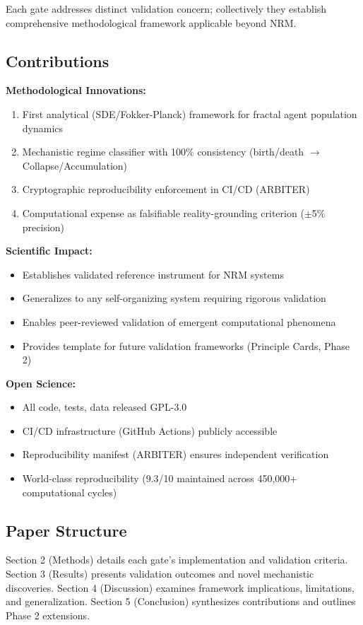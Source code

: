 \documentclass[11pt]{article}
\begin{document}
Each gate addresses distinct validation concern; collectively they establish comprehensive methodological framework applicable beyond NRM.

\subsection{Contributions}

\textbf{Methodological Innovations:}
\begin{enumerate}
\item First analytical (SDE/Fokker-Planck) framework for fractal agent population dynamics
\item Mechanistic regime classifier with 100\% consistency (birth/death $\to$ Collapse/Accumulation)
\item Cryptographic reproducibility enforcement in CI/CD (ARBITER)
\item Computational expense as falsifiable reality-grounding criterion ($\pm$5\% precision)
\end{enumerate}

\textbf{Scientific Impact:}
\begin{itemize}
\item Establishes validated reference instrument for NRM systems
\item Generalizes to any self-organizing system requiring rigorous validation
\item Enables peer-reviewed validation of emergent computational phenomena
\item Provides template for future validation frameworks (Principle Cards, Phase 2)
\end{itemize}

\textbf{Open Science:}
\begin{itemize}
\item All code, tests, data released GPL-3.0
\item CI/CD infrastructure (GitHub Actions) publicly accessible
\item Reproducibility manifest (ARBITER) ensures independent verification
\item World-class reproducibility (9.3/10 maintained across 450,000+ computational cycles)
\end{itemize}

\subsection{Paper Structure}

Section 2 (Methods) details each gate's implementation and validation criteria. Section 3 (Results) presents validation outcomes and novel mechanistic discoveries. Section 4 (Discussion) examines framework implications, limitations, and generalization. Section 5 (Conclusion) synthesizes contributions and outlines Phase 2 extensions.
\end{document}
